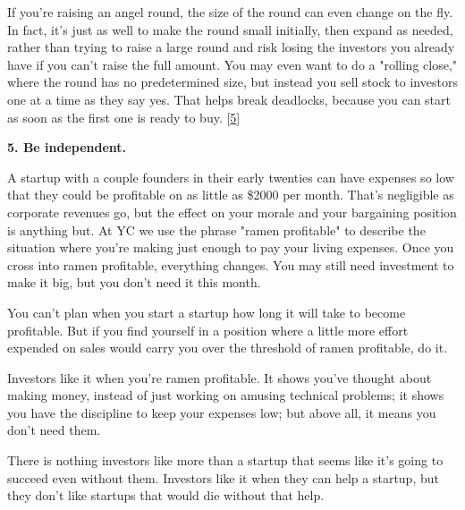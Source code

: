 If you're raising an angel round, the
                    size of the round can even change on the fly. In fact, it's
                    just as well to make the round small initially, then expand
                    as needed, rather than trying to raise a large round and
                    risk losing the investors you already have if you can't
                    raise the full amount. You may even want to do a "rolling
                    close," where the round has no predetermined size, but
                    instead you sell stock to investors one at a time as they
                    say yes. That helps break deadlocks, because you can start
                    as soon as the first one is ready to buy.
                    [\href{\#f5n}{5}]


                    \textbf{5. Be independent.}

A startup with a couple
                    founders in their early twenties can have expenses so low
                    that they could be profitable on as little as \$2000 per
                    month. That's negligible as corporate revenues go, but the
                    effect on your morale and your bargaining position is
                    anything but. At YC we use the phrase "ramen profitable" to
                    describe the situation where you're making just enough to
                    pay your living expenses. Once you cross into ramen
                    profitable, everything changes. You may still need
                    investment to make it big, but you don't need it this
                    month.

You can't plan when you start a startup
                    how long it will take to become profitable. But if you find
                    yourself in a position where a little more effort expended
                    on sales would carry you over the threshold of ramen
                    profitable, do it.

Investors like it when you're
                    ramen profitable. It shows you've thought about making
                    money, instead of just working on amusing technical
                    problems; it shows you have the discipline to keep your
                    expenses low; but above all, it means you don't need
                    them.

There is nothing investors like more than a
                    startup that seems like it's going to succeed even without
                    them. Investors like it when they can help a startup, but
                    they don't like startups that would die without that
                    help.

